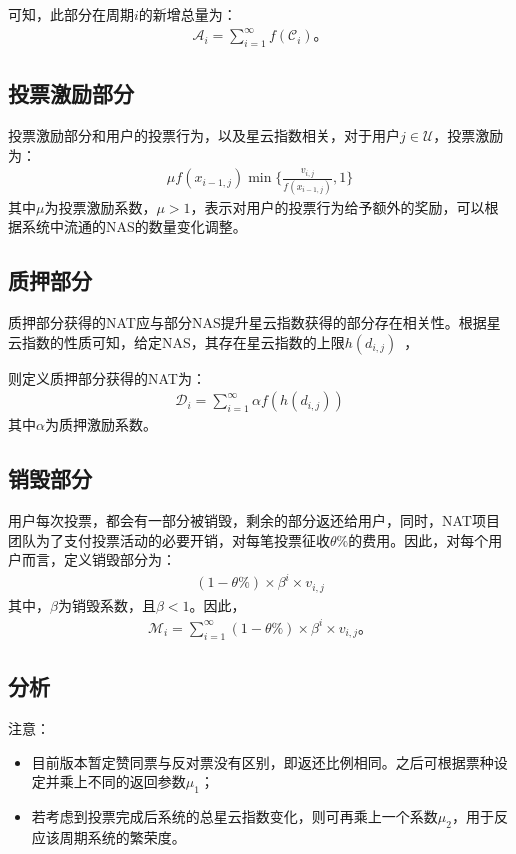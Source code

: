 可知，此部分在周期$i$的新增总量为：
\begin{align}
\mathcal{A}_i = \sum_{i=1}^{\infty}f(\mathcal{C}_i)。
\end{align}

\subsection{投票激励部分}
投票激励部分和用户的投票行为，以及星云指数相关，对于用户$j \in \mathcal{U}$，投票激励为：
\begin{align}
\mu f(x_{i-1,j}) \min\{\frac{v_{i,j}}{f(x_{i-1,j})},1\}
\end{align}
\noindent 其中$\mu$为投票激励系数，$\mu > 1$，表示对用户的投票行为给予额外的奖励，可以根据系统中流通的NAS的数量变化调整。

\subsection{质押部分}
质押部分获得的NAT应与部分NAS提升星云指数获得的部分存在相关性。根据星云指数的性质可知，给定NAS，其存在星云指数的上限$h(d_{i,j})$~\cite{ImproveNR}，

则定义质押部分获得的NAT为：
\begin{align}
\mathcal{D}_i = \sum_{i=1}^{\infty}\alpha f(h(d_{i,j}))
\end{align}
\noindent 其中$\alpha$为质押激励系数。


\subsection{销毁部分}
\label{burn}
用户每次投票，都会有一部分被销毁，剩余的部分返还给用户，同时，NAT项目团队为了支付投票活动的必要开销，对每笔投票征收$\theta\%$的费用。因此，对每个用户而言，定义销毁部分为：
\begin{align}
(1-\theta\%) \times \beta^i \times v_{i,j}
\end{align}
\noindent 其中，$\beta$为销毁系数，且$\beta < 1$。因此，
\begin{align}
    \mathcal{M}_i = \sum_{i=1}^{\infty} (1-\theta\%) \times \beta^i \times v_{i,j} 。
\end{align}

\subsection{分析}

注意：
\begin{itemize}
\item 目前版本暂定赞同票与反对票没有区别，即返还比例相同。之后可根据票种设定并乘上不同的返回参数$\mu_1$；
\item 若考虑到投票完成后系统的总星云指数变化，则可再乘上一个系数$\mu_2$，用于反应该周期系统的繁荣度。
\end{itemize}


